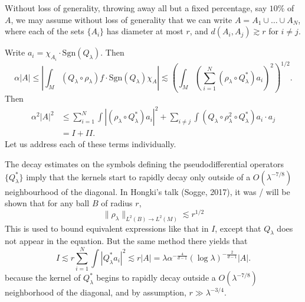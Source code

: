 \documentclass{article}
\theoremstyle{plain}
\theoremstyle{remark}
\theoremstyle{definition}
\begin{document}
Without loss of generality, throwing away all but a fixed percentage, say $10\%$ of $A$, we may assume without loss of generality that we can write $A = A_1 \cup \dots \cup A_N$, where each of the sets $\{ A_i \}$ has diameter at most $r$, and $d(A_i,A_j) \gtrsim r$ for $i \neq j$.

Write $a_i = \chi_{A_i} \cdot \text{Sgn}(Q_\lambda)$. Then
%
\[ \alpha |A| \leq \left| \int_M (Q_\lambda \circ \rho_\lambda) f \cdot \text{Sgn}(Q_\lambda) \chi_A \right| \lesssim \left( \int_M \left( \sum_{i = 1}^N (\rho_\lambda \circ Q_\lambda^*) a_i \right)^2 \right)^{1/2}. \]
%
Then
%
\begin{align*}
    \alpha^2 |A|^2 &\leq \sum_{i = 1}^N \int |(\rho_\lambda \circ Q_\lambda^*) a_i |^2 + \sum_{i \neq j} \int \left(  Q_\lambda \circ \rho_\lambda^2 \circ Q_\lambda^* \right) a_i \cdot a_j\\
    &= I + II.
\end{align*}
%
Let us address each of these terms individually.

The decay estimates on the symbols defining the pseudodifferential operators $\{ Q_\lambda^* \}$ imply that the kernels start to rapidly decay only outside of a $O(\lambda^{-7/8})$ neighbourhood of the diagonal. In Hongki's talk (Sogge, 2017), it was / will be shown that for any ball $B$ of radius $r$,
%
\[ \| \rho_\lambda \|_{L^2(B) \to L^2(M)} \lesssim r^{1/2} \]
%
This is used to bound equivalent expressions like that in $I$, except that $Q_\lambda$ does not appear in the equation. But the same method there yields that
%
\[ I \lesssim r \sum_{i = 1}^N \int |Q_{\lambda}^* a_i|^2 \lesssim r |A| = \lambda \alpha^{- \frac{4}{d-1}} (\log \lambda)^{- \frac{2}{d - 1}} |A|. \]
%
because the kernel of $Q_\lambda^*$ begins to rapidly decay outside a $O(\lambda^{-7/8})$ neighborhood of the diagonal, and by assumption, $r \gg \lambda^{-3/4}$.
\end{document}
